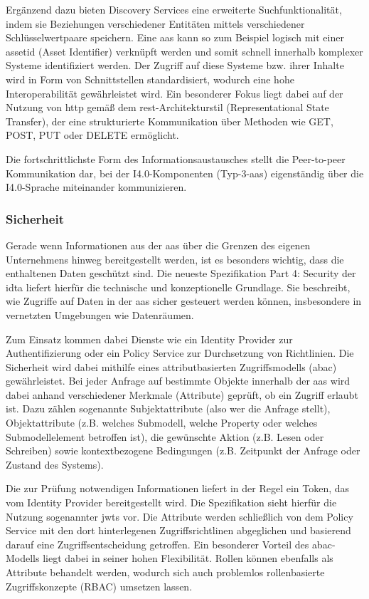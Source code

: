 Ergänzend dazu bieten Discovery Services eine erweiterte Suchfunktionalität, indem sie Beziehungen verschiedener Entitäten mittels verschiedener Schlüsselwertpaare speichern.
Eine \acs{aas} kann so zum Beispiel logisch mit einer \acs{assetid} (Asset Identifier) verknüpft werden und somit schnell innerhalb komplexer Systeme identifiziert werden.
Der Zugriff auf diese Systeme bzw. ihrer Inhalte wird in Form von Schnittstellen standardisiert, wodurch eine hohe Interoperabilität gewährleistet wird.
Ein besonderer Fokus liegt dabei auf der Nutzung von \ac{http} gemäß dem \acs{rest}-Architekturstil (Representational State Transfer), der eine strukturierte Kommunikation über Methoden wie GET, POST, PUT oder DELETE ermöglicht.

Die fortschrittlichste Form des Informationsaustausches stellt die Peer-to-peer Kommunikation dar, bei der I4.0-Komponenten (Typ-3-\acs{aas}) eigenständig über die I4.0-Sprache miteinander kommunizieren.

\subsubsection{Sicherheit}
\label{sec: Sicherheit}
Gerade wenn Informationen aus der \acs{aas} über die Grenzen des eigenen Unternehmens hinweg bereitgestellt werden, ist es besonders wichtig, dass die enthaltenen Daten geschützt sind. 
Die neueste Spezifikation Part 4: Security \cite{SpezifikationPart4} der \acs{idta} liefert hierfür die technische und konzeptionelle Grundlage.
Sie beschreibt, wie Zugriffe auf Daten in der \acs{aas} sicher gesteuert werden können, insbesondere in vernetzten Umgebungen wie Datenräumen.

Zum Einsatz kommen dabei Dienste wie ein Identity Provider zur Authentifizierung oder ein Policy Service zur Durchsetzung von Richtlinien.
Die Sicherheit wird dabei mithilfe eines attributbasierten Zugriffsmodells (\ac{abac}) gewährleistet.
Bei jeder Anfrage auf bestimmte Objekte innerhalb der \acs{aas} wird dabei anhand verschiedener Merkmale (Attribute) geprüft, ob ein Zugriff erlaubt ist.
Dazu zählen sogenannte Subjektattribute (also wer die Anfrage stellt), Objektattribute (z.B. welches Submodell, welche Property oder welches Submodellelement betroffen ist), die gewünschte Aktion (z.B. Lesen oder Schreiben) sowie kontextbezogene Bedingungen (z.B. Zeitpunkt der Anfrage oder Zustand des Systems).

Die zur Prüfung notwendigen Informationen liefert in der Regel ein Token, das vom Identity Provider bereitgestellt wird. Die Spezifikation sieht hierfür die Nutzung sogenannter \acp{jwt} vor.
Die Attribute werden schließlich von dem Policy Service mit den dort hinterlegenen Zugriffsrichtlinen abgeglichen und basierend darauf eine Zugriffsentscheidung getroffen.
Ein besonderer Vorteil des \acs{abac}-Modells liegt dabei in seiner hohen Flexibilität. Rollen können ebenfalls als Attribute behandelt werden, wodurch sich auch problemlos rollenbasierte Zugriffskonzepte (RBAC) umsetzen lassen. 

